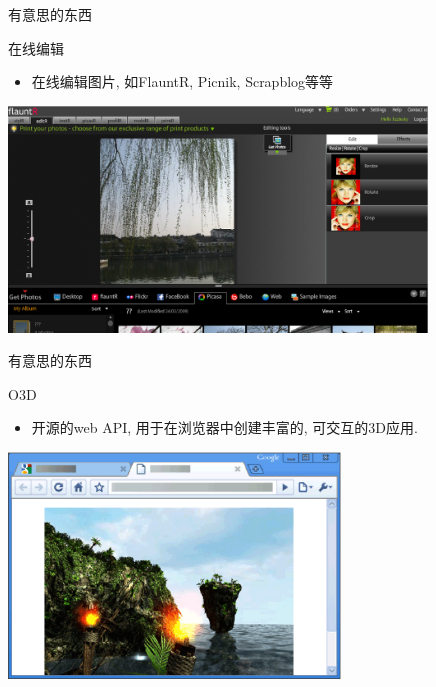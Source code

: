\documentclass[dvipdfm]{beamer}
\begin{document}
\begin{frame}[t]{有意思的东西}
  \begin{block}{在线编辑}
    \begin{itemize}
    \item 在线编辑图片, 如FlauntR, Picnik, Scrapblog等等 \pause
    \end{itemize}
  \end{block}
  \begin{center}
  \centering \includegraphics[height=6cm]{figure/flauntr.eps}
  \end{center}
\end{frame}

\begin{frame}[t]{有意思的东西}
  \begin{block}{O3D}
    \begin{itemize}
    \item 开源的web API, 用于在浏览器中创建丰富的, 可交互的3D应用.  \pause
    \end{itemize}
  \end{block}
  \begin{center}
  \centering \includegraphics[height=6cm]{figure/o3d.eps}
  \end{center}
\end{frame}
\end{document}
